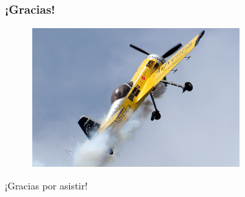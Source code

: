 \documentclass[18pt]{beamer}
\begin{document}
\begin{frame}

	\frametitle{¡Gracias!}
	
	\begin{figure}
		\includegraphics[width=8cm]{images/Sukhoi_Su-31_Ramon_Alonso_EC-HGL.jpg}
	\end{figure}

	\begin{center}
		\Large ¡Gracias por asistir!
	\end{center}
	
\end{frame}

	
\end{document}
